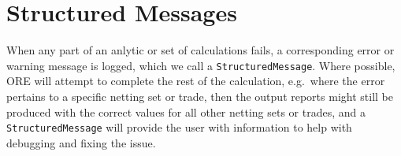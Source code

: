 

\section{Structured Messages}\label{sec:structured_messages}


When any part of an anlytic or set of calculations fails, a corresponding error or warning message is logged, which we call
a \lstinline!StructuredMessage!. Where possible, ORE will attempt to complete the
rest of the calculation, e.g.\ where the error pertains to a specific netting set or trade, then the output reports might still be
produced with the correct values for all other netting sets or trades, and a \lstinline!StructuredMessage! will provide the user with
information to help with debugging and fixing the issue.

